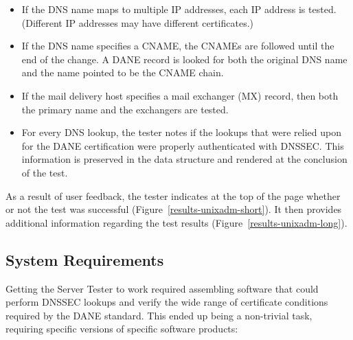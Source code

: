 \documentclass[preprint,3p,11pt]{elsarticle}
\begin{document}
\begin{itemize}
\item If the DNS name maps to multiple IP addresses, each IP address
  is tested. (Different IP addresses may have different certificates.)
\item If the DNS name specifies a CNAME, the CNAMEs are followed until
  the end of the change. A DANE record is looked for both the original
  DNS name and the name pointed to be the CNAME chain.
\item If the mail delivery host specifies a mail exchanger (MX)
  record, then both the primary name and the exchangers are tested.
\item For every DNS lookup, the tester notes if the lookups that were
  relied upon for the DANE certification were
  properly authenticated with DNSSEC. This information is preserved in
  the data structure and rendered at the conclusion of the test. 
\end{itemize}

As a result of user feedback, the tester indicates at the top of the
page whether or not the test was successful (Figure~\ref{results-unixadm-short}). It then provides
additional information regarding the test results (Figure~\ref{results-unixadm-long}).



\subsection{System Requirements}

Getting the Server Tester to work required assembling software that
could perform DNSSEC lookups and verify the wide range of certificate
conditions required by the DANE standard. This ended up being a
non-trivial task, requiring specific versions of specific software products:
\end{document}
